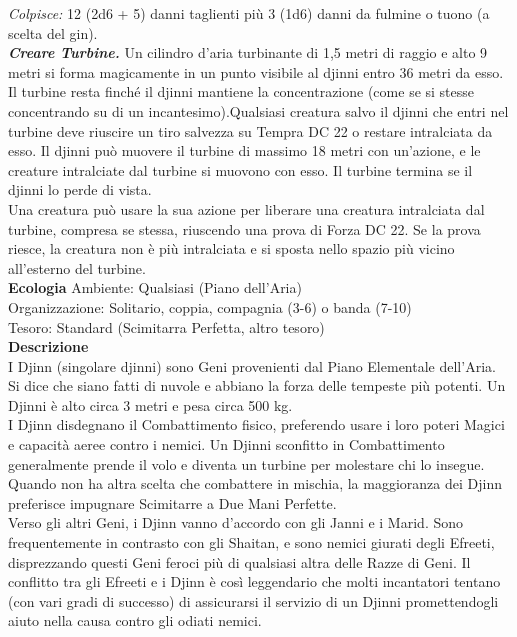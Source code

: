 \begin{multicols}{2}
\emph{Colpisce:} 12 (2d6 + 5) danni taglienti più 3 (1d6) danni da fulmine o tuono (a scelta del gin).\\
\emph{\textbf{Creare Turbine.}} Un cilindro d'aria turbinante di 1,5 metri di raggio e alto 9 metri si forma magicamente in un punto visibile al djinni entro 36 metri da esso. Il turbine resta finché il djinni mantiene la concentrazione (come se si stesse concentrando su di un incantesimo).Qualsiasi creatura salvo il djinni che entri nel turbine  deve riuscire un tiro salvezza su Tempra DC  22 o restare intralciata da esso. Il djinni può muovere il turbine di massimo 18 metri con un'azione, e le creature intralciate dal turbine si muovono con esso. Il turbine termina se il djinni lo perde di vista.\\
Una creatura può usare la sua azione per liberare una creatura intralciata dal turbine, compresa se stessa, riuscendo una prova di Forza DC  22. Se la prova riesce, la creatura non è più intralciata e si sposta nello spazio più vicino all'esterno del turbine.\\
\textbf{Ecologia}
Ambiente: Qualsiasi (Piano dell'Aria)\\
Organizzazione: Solitario, coppia, compagnia (3-6) o banda (7-10)\\
Tesoro: Standard (Scimitarra Perfetta, altro tesoro)\\
\textbf{Descrizione}\\
I Djinn (singolare djinni) sono Geni provenienti dal Piano Elementale dell'Aria. Si dice che siano fatti di nuvole e abbiano la forza delle tempeste più potenti. Un Djinni è alto circa 3 metri e pesa circa 500 kg.\\

I Djinn disdegnano il Combattimento fisico, preferendo usare i loro poteri Magici e capacità aeree contro i nemici. Un Djinni sconfitto in Combattimento generalmente prende il volo e diventa un turbine per molestare chi lo insegue. Quando non ha altra scelta che combattere in mischia, la maggioranza dei Djinn preferisce impugnare Scimitarre a Due Mani Perfette.\\

Verso gli altri Geni, i Djinn vanno d’accordo con gli Janni e i Marid. Sono frequentemente in contrasto con gli Shaitan, e sono nemici giurati degli Efreeti, disprezzando questi Geni feroci più di qualsiasi altra delle Razze di Geni. Il conflitto tra gli Efreeti e i Djinn è così leggendario che molti incantatori tentano (con vari gradi di successo) di assicurarsi il servizio di un Djinni promettendogli aiuto nella causa contro gli odiati nemici.\\


\end{multicols}

